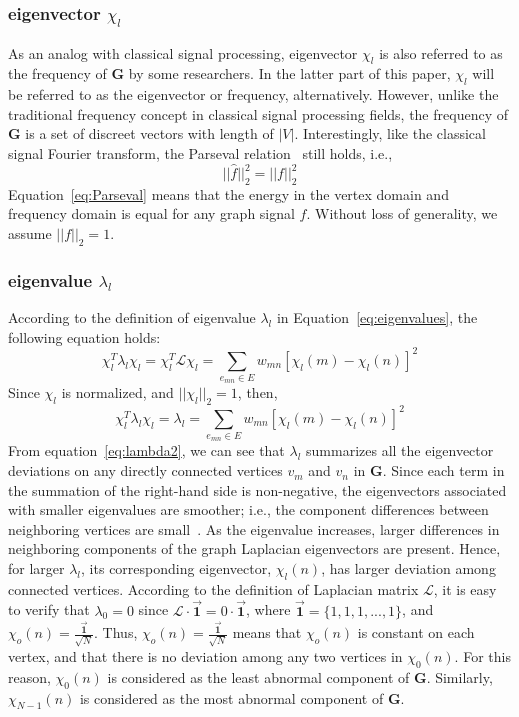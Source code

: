 \documentclass[twoside,leqno,twocolumn]{article}
\begin{document}
\subsubsection{eigenvector $\chi_l$}
As an analog with classical signal processing, eigenvector $\chi_l$ is also referred to as
the  frequency of $\mathbf{G}$ by some researchers. In the latter part of this paper, $\chi_l$ will be referred to as the eigenvector or frequency, alternatively. However, unlike the traditional frequency concept in classical signal processing fields, the frequency of $\mathbf{G}$ is a set of discreet vectors with length of $|V|$. Interestingly, like the classical signal Fourier transform, the
Parseval relation~\cite{shuman2015vertex} still holds, i.e.,
\begin{equation}
\label{eq:Parseval}
||\hat{f}||_2^2=||f||_2^2
\end{equation}
Equation~\ref{eq:Parseval} means that the
energy in the vertex domain and frequency domain is equal for any graph signal $f$. Without loss of generality, we assume $||f||_2 =1$.

\subsubsection{eigenvalue $\lambda_l$}
According to the definition of eigenvalue $\lambda_l$  in Equation~\ref{eq:eigenvalues}, the following equation holds:
\begin{equation}
\label{eq:lambda1}
\chi_{l}^T\lambda_{l}\chi_{l}=\chi_{l}^T\mathcal{L}\chi_{l}= \sum_{e_{mn}\in E} w_
{mn}[\chi_{l}(m)-\chi_{l}(n)]^2
\end{equation}Since $\chi_{l}$ is normalized, and $||\chi_{l}||_2 =1$, then,
\begin{equation}
\label{eq:lambda2}
\chi_{l}^T\lambda_{l}\chi_{l}=\lambda_l= \sum_{e_{mn}\in E} w_
{mn}[\chi_{l}(m)-\chi_{l}(n)]^2
\end{equation}
From equation~\ref{eq:lambda2}, we can see that $\lambda_l$ summarizes all the eigenvector deviations on any directly connected vertices $v_m$ and $v_n$ in $\mathbf{G}$. Since each term in the summation of the right-hand side is non-negative, the eigenvectors associated with smaller eigenvalues are smoother; i.e., the component differences between neighboring vertices are
small~\cite{shuman2015vertex}. As the eigenvalue increases, larger differences in neighboring
components of the graph Laplacian eigenvectors are present.
Hence, for larger $\lambda_l$, its corresponding eigenvector, $\chi_l(n)$, has larger deviation among connected vertices. According to the definition of Laplacian matrix $\mathcal{L}$, it is easy to verify that $\lambda_0=0$ since $\mathcal{L}\cdot\vec{\textbf{1}}= 0\cdot\vec{\textbf{1}}$, where $\vec{\textbf{1}}=\{1,1,1,...,1\}$, and $\chi_o(n)=\frac{\vec{\textbf{1}}}{\sqrt{N}}$. Thus, $\chi_o(n)=\frac{\vec{\textbf{1}}}{\sqrt{N}}$ means that $\chi_o(n)$ is constant on each vertex, and that
there is no deviation among any two vertices in $\chi_0(n)$. For this reason, $\chi_0(n)$ is considered as the least abnormal component of $\mathbf{G}$. Similarly, $\chi_{N-1}(n)$ is considered as the most abnormal component of $\mathbf{G}$.
\end{document}
